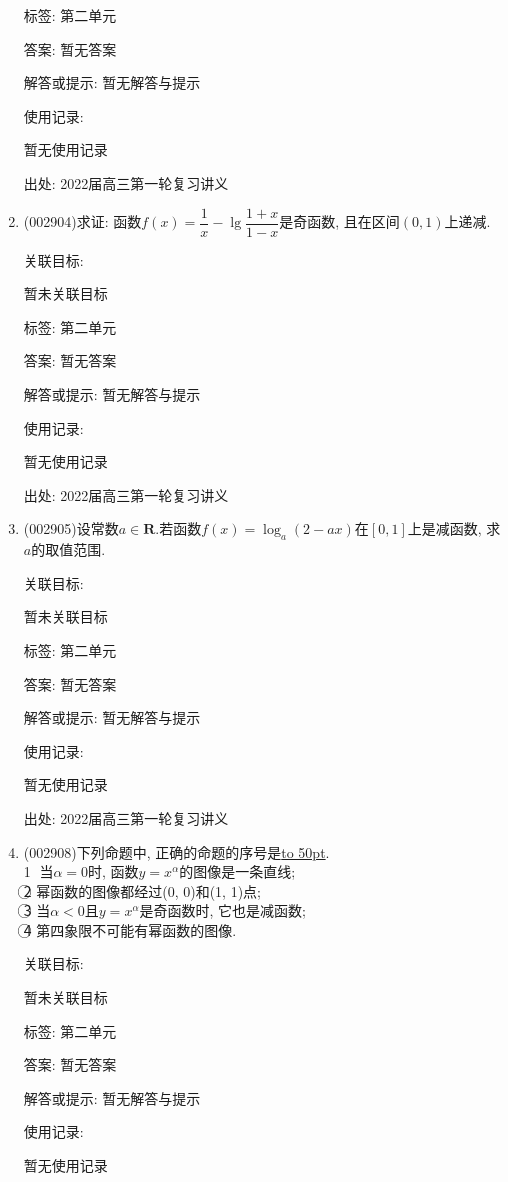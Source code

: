 \documentclass[10pt,a4paper]{article}
\newcommand{\blank}[1]{\underline{\hbox to #1pt{}}}
\begin{document}
\begin{enumerate}[1.]
标签: 第二单元

答案: 暂无答案

解答或提示: 暂无解答与提示

使用记录:

暂无使用记录


出处: 2022届高三第一轮复习讲义
\item { (002904)}求证: 函数$f(x)=\dfrac 1x-\lg\dfrac{1+x}{1-x}$是奇函数, 且在区间$(0,1)$上递减.


关联目标:

暂未关联目标



标签: 第二单元

答案: 暂无答案

解答或提示: 暂无解答与提示

使用记录:

暂无使用记录


出处: 2022届高三第一轮复习讲义
\item { (002905)}设常数$a\in \mathbf{R}$.若函数$f(x)=\log_a(2-ax)$在$[0,1]$上是减函数, 求$a$的取值范围.


关联目标:

暂未关联目标



标签: 第二单元

答案: 暂无答案

解答或提示: 暂无解答与提示

使用记录:

暂无使用记录


出处: 2022届高三第一轮复习讲义
\item { (002908)}下列命题中, 正确的命题的序号是\blank{50}.\\
\textcircled{1} 当$\alpha =0$时, 函数$y={x^{\alpha }}$的图像是一条直线;\\
\textcircled{2} 幂函数的图像都经过(0, 0)和(1, 1)点;\\
\textcircled{3} 当$\alpha <0$且$y={x^{\alpha }}$是奇函数时, 它也是减函数;\\
\textcircled{4} 第四象限不可能有幂函数的图像.


关联目标:

暂未关联目标



标签: 第二单元

答案: 暂无答案

解答或提示: 暂无解答与提示

使用记录:

暂无使用记录



\end{enumerate}
\end{document}
